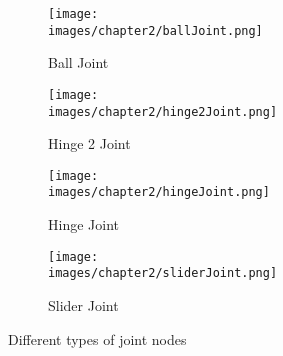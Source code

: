 \begin{figure}[h!]
  \centering
  \begin{subfigure}[b]{0.47\linewidth}
  	\texttt{[image: \\images/chapter2/ballJoint.png]}
  	\caption{Ball Joint}
  	\label{fig:ch-2:ball-joint}
  \end{subfigure}
  \vspace{0.00mm}
  \begin{subfigure}[b]{0.47\linewidth}
  	\texttt{[image: \\images/chapter2/hinge2Joint.png]}
  	\caption{Hinge 2 Joint}
  	\label{fig:ch-2:highe-2-joint}
  \end{subfigure}
  \vspace{0.00mm}
  \begin{subfigure}[b]{0.47\linewidth}
  	\texttt{[image: \\images/chapter2/hingeJoint.png]}
  	\caption{Hinge Joint}
  	\label{fig:ch-2:hinge-joint}
  \end{subfigure}
  \vspace{0.00mm}
  \begin{subfigure}[b]{0.47\linewidth}
  	\texttt{[image: \\images/chapter2/sliderJoint.png]}
  	\caption{Slider Joint}
  	\label{fig:ch-2:slider-joint}
  \end{subfigure}
  \caption{Different types of joint nodes}
  \label{fig:ch-2:joints}
\end{figure}






